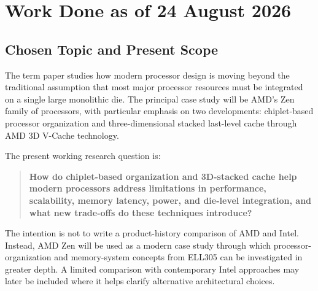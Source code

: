 \documentclass[12pt,a4paper,twoside]{article}
\begin{document}
\clearpage
\tableofcontents

\clearpage
{}
{}
\listoftables

\clearpage
{}
{}
\listoffigures

\clearpage
\glsaddall
\printglossary[title={Glossary}]
\clearpage

\section{Work Done as of 24 August 2026}
\label{sec:work-done}

\subsection{Chosen Topic and Present Scope}
\label{sec:scope}

The term paper studies how modern processor design is moving beyond the traditional assumption that most major processor resources must be integrated on a single large monolithic die. The principal case study will be AMD's Zen family of processors, with particular emphasis on two developments: chiplet-based processor organization and three-dimensional stacked last-level cache through AMD 3D V-Cache technology.

The present working research question is:

\begin{quote}
\textbf{How do chiplet-based organization and 3D-stacked cache help modern processors address limitations in performance, scalability, memory latency, power, and die-level integration, and what new trade-offs do these techniques introduce?}
\end{quote}

The intention is not to write a product-history comparison of AMD and Intel. Instead, AMD Zen will be used as a modern case study through which processor-organization and memory-system concepts from ELL305 can be investigated in greater depth. A limited comparison with contemporary Intel approaches may later be included where it helps clarify alternative architectural choices.

\end{document}
